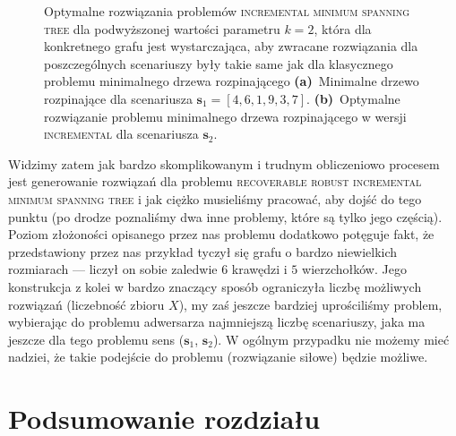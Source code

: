 \begin{figure}[!h]
\begin{subfigure}[b]{0.3\textwidth}
		\caption{}
		\label{fig:robincrexampleopt:b}
	\end{subfigure}
	\hfill\null
	\caption{
		Optymalne rozwiązania problemów \textsc{incremental minimum spanning tree} dla podwyższonej wartości parametru $k = 2$, która dla konkretnego grafu jest wystarczająca, aby zwracane rozwiązania dla poszczególnych scenariuszy były takie same jak dla klasycznego problemu minimalnego drzewa rozpinającego
		\textbf{(a)}~Minimalne drzewo rozpinające dla scenariusza $\textbf{s}_{1} = \left[ 4, 6, 1, 9, 3, 7 \right]$.
		\textbf{(b)}~Optymalne rozwiązanie problemu minimalnego drzewa rozpinającego w wersji \textsc{incremental} dla scenariusza $\textbf{s}_{2}$.
	}
	\label{fig:robincrexampleopt}
\end{figure}

\vspace*{5pt}

Widzimy zatem jak bardzo skomplikowanym i trudnym obliczeniowo procesem jest generowanie rozwiązań dla problemu \textsc{recoverable robust incremental minimum spanning tree} i jak ciężko musieliśmy pracować, aby dojść do tego punktu (po drodze poznaliśmy dwa inne problemy, które są tylko jego częścią). Poziom złożoności opisanego przez nas problemu dodatkowo potęguje fakt, że przedstawiony przez nas przykład tyczył się grafu o bardzo niewielkich rozmiarach --- liczył on sobie zaledwie $6$ krawędzi i $5$ wierzchołków. Jego konstrukcja z kolei w bardzo znaczący sposób ograniczyła liczbę możliwych rozwiązań (liczebność zbioru $X$), my zaś jeszcze bardziej uprościliśmy problem, wybierając do problemu adwersarza najmniejszą liczbę scenariuszy, jaka ma jeszcze dla tego problemu sens ($\textbf{s}_{1}$, $\textbf{s}_{2}$). W ogólnym przypadku nie możemy mieć nadziei, że takie podejście do problemu (rozwiązanie siłowe) będzie możliwe.


\section{Podsumowanie rozdziału}

